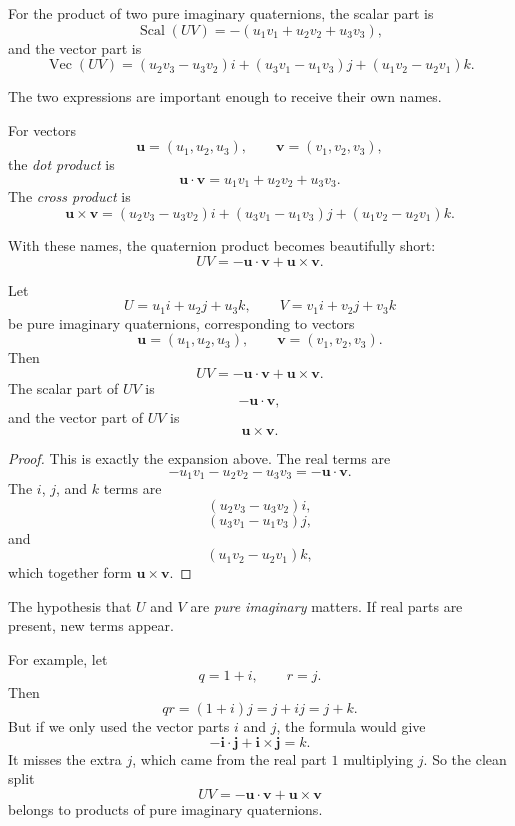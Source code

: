 For the product of two pure imaginary quaternions, the scalar part is
\[
    \operatorname{Scal}(UV)=-(u_1v_1+u_2v_2+u_3v_3),
\]
and the vector part is
\[
    \operatorname{Vec}(UV)
    =
    (u_2v_3-u_3v_2)i
    +(u_3v_1-u_1v_3)j
    +(u_1v_2-u_2v_1)k.
\]

The two expressions are important enough to receive their own names.

\begin{definition}
For vectors
\[
    \mathbf u=(u_1,u_2,u_3),
    \qquad
    \mathbf v=(v_1,v_2,v_3),
\]
the \emph{dot product} is
\[
    \mathbf u\cdot\mathbf v
    =
    u_1v_1+u_2v_2+u_3v_3.
\]
The \emph{cross product} is
\[
    \mathbf u\times\mathbf v
    =
    (u_2v_3-u_3v_2)i
    +(u_3v_1-u_1v_3)j
    +(u_1v_2-u_2v_1)k.
\]
\end{definition}

With these names, the quaternion product becomes beautifully short:
\[
\boxed{
    UV= -\mathbf u\cdot\mathbf v+\mathbf u\times\mathbf v.
}
\]

\begin{theorem}
Let
\[
    U=u_1i+u_2j+u_3k,
    \qquad
    V=v_1i+v_2j+v_3k
\]
be pure imaginary quaternions, corresponding to vectors
\[
    \mathbf u=(u_1,u_2,u_3),
    \qquad
    \mathbf v=(v_1,v_2,v_3).
\]
Then
\[
    UV= -\mathbf u\cdot\mathbf v+\mathbf u\times\mathbf v.
\]
The scalar part of \(UV\) is
\[
    -\mathbf u\cdot\mathbf v,
\]
and the vector part of \(UV\) is
\[
    \mathbf u\times\mathbf v.
\]
\end{theorem}

\begin{proof}
This is exactly the expansion above.  The real terms are
\[
    -u_1v_1-u_2v_2-u_3v_3
    =
    -\mathbf u\cdot\mathbf v.
\]
The \(i\), \(j\), and \(k\) terms are
\[
    (u_2v_3-u_3v_2)i,
\]
\[
    (u_3v_1-u_1v_3)j,
\]
and
\[
    (u_1v_2-u_2v_1)k,
\]
which together form \(\mathbf u\times\mathbf v\).
\end{proof}

The hypothesis that \(U\) and \(V\) are \emph{pure imaginary} matters.  If real parts are
present, new terms appear.

For example, let
\[
    q=1+i,
    \qquad
    r=j.
\]
Then
\[
    qr=(1+i)j=j+ij=j+k.
\]
But if we only used the vector parts \(i\) and \(j\), the formula would give
\[
    -\mathbf i\cdot\mathbf j+\mathbf i\times\mathbf j=k.
\]
It misses the extra \(j\), which came from the real part \(1\) multiplying \(j\).
So the clean split
\[
    UV=-\mathbf u\cdot\mathbf v+\mathbf u\times\mathbf v
\]
belongs to products of pure imaginary quaternions.

